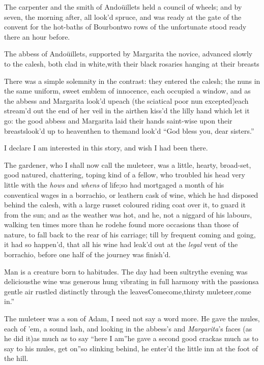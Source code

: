 \documentclass{article}
\begin{document}
\tsh The carpenter and the smith of Andoüillets held a council
of wheels; and by seven, the morning after, all look’d spruce,
and was ready at the gate of the convent for the hot-baths of
Bourbon\tsk\break two rows of the unfortunate stood ready there an
hour before.

The abbess of Andoüillets, supported by Margarita the novice, advanced slowly to the
calesh, both clad in white,\pb with their black rosaries hanging at their breasts\tsh

\tsh There was a simple solemnity\break
in the contrast: they entered the calesh;\break
the nuns in the same uniform, sweet emblem of
innocence, each occupied a window, and as the abbess and
Margarita look’d up\tsk each (the sciatical poor nun
excepted)\tsk each stream’d out the end of her veil in the
air\tsk then kiss’d the lilly hand which let it go: the
good abbess and Margarita laid their hands saint-wise upon
their breasts\tsk look’d up to heaven\tsk then to
them\tsk and look’d “God bless you, dear
sisters.”

I declare I am interested in this story, and wish I had been
there.

\newpage
The gardener, who I shall now call the muleteer, was a little,
hearty, broad-set, good natured, chattering, toping kind of a
fellow, who troubled his head very little with the \textit{hows} and
\textit{whens} of life;\break so had mortgaged a month of his conventical
wages in a borrachio, or leathern cask of wine, which he had
disposed behind the calesh, with a large russet coloured
riding coat over it, to guard it from the sun; and as the weather
was hot, and he, not a niggard of his labours, walking ten times
more than he rode\tsk he found more occasions than those of
nature, to fall back to the rear of his carriage; till by frequent
coming and going, it had so happen’d, that all his wine had
leak’d out at the \textit{legal} vent of the borrachio, before one
half of the journey was finish’d.

\newpage
Man is a creature born to habitudes. The day had been
sultry\tsk the evening was delicious\tsk the wine was
generous\tsk\break{}
hung vibrating in full harmony with the
passions\tsk a gentle air rustled distinctly through the
leaves\tsk \lqq Come\tsk come,\break\lqq thirsty
muleteer,\tsk come in.”

\tsh The muleteer was a son of Adam, I need not say a
word more. He gave the mules, each of ’em, a sound lash,\break
and looking in the abbess’s and \textit{Margarita}’s faces
(as he did it)\tsk as much as to say “here I
am”\tsk he gave a second good\break
crack\tsk as much as to say to his mules,\pb
\lqq get on”\tsh so slinking behind,
he enter’d the little inn at the foot of the hill.
\end{document}
